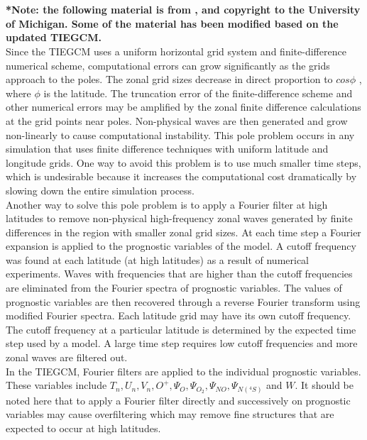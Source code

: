 \section{}\label{cap:fourier}
%
\textbf{*Note: the following material is from \cite{wang1998}, 
and copyright to the University of Michigan. Some of 
the material has been modified based on the updated TIEGCM.} \\
%
Since the TIEGCM uses a uniform horizontal grid system 
and finite-difference numerical scheme, computational 
errors can grow significantly as the grids approach to 
the poles. The zonal grid sizes decrease in direct 
proportion to $cos \phi$ , where $\phi$ is the latitude. The truncation 
error of the finite-difference scheme and other numerical 
errors may be amplified by the zonal finite difference 
calculations at the grid points near poles. Non-physical 
waves are then generated and grow non-linearly to cause 
computational instability. This pole problem occurs in any 
simulation that uses finite difference techniques with uniform 
latitude and longitude grids. One way to avoid this problem is 
to use much smaller time steps, which is undesirable because it 
increases the computational cost dramatically by slowing down the 
entire simulation process. \\
%
Another way to solve this pole problem is to apply a Fourier 
filter at high latitudes to remove non-physical high-frequency 
zonal waves generated by finite differences in the region with 
smaller zonal grid sizes. At each time step a Fourier expansion 
is applied to the prognostic variables of the model. A cutoff 
frequency was found at each latitude (at high latitudes) as a 
result of numerical experiments. Waves with frequencies that are 
higher than the cutoff frequencies are eliminated from the Fourier 
spectra of prognostic variables. The values of prognostic variables 
are then recovered through a reverse Fourier transform using modified 
Fourier spectra. Each latitude grid may have its own cutoff frequency. 
The cutoff frequency at a particular latitude is determined by the 
expected time step used by a model. A large time step requires low 
cutoff frequencies and more zonal waves are filtered out.\\
% 
In the TIEGCM, Fourier filters are applied to the individual 
prognostic variables. These variables include  $T_n, U_n, V_n, O^+, 
\Psi_O, \Psi_{O_2},
\Psi_{NO}, \Psi_{N(^4S)}$  and  $W$. 
It should be noted here that to apply a Fourier filter directly and 
successively on prognostic variables may cause overfiltering which 
may remove fine structures that are expected to occur at high latitudes.

 


